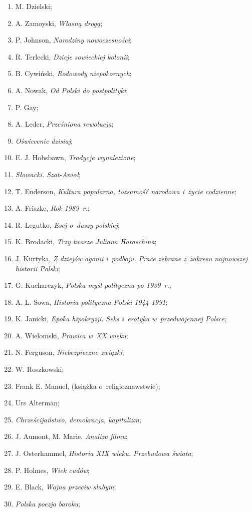 \documentclass[a4paper,11pt]{article}
\begin{document}
\begin{enumerate}
\item M. Dzielski;
\item A. Zamoyski, \emph{Własną drogą};
\item P. Johnson, \emph{Narodziny nowoczesności};
\item R. Terlecki, \emph{Dzieje sowieckiej kolonii};
\item B. Cywiński, \emph{Rodowody niepokornych};
\item A. Nowak, \emph{Od Polski do postpolityki};
\item P. Gay;
\item A. Leder, \emph{Prześniona rewolucja};
\item \emph{Oświecenie dzisiaj};
\item E. J. Hobsbawn, \emph{Tradycje wynalezione};
\item \emph{Słowacki. Szat-Anioł};
\item T. Enderson, \emph{Kultura popularna, tożsamość narodowa i~życie
    codzienne};
\item A. Friszke, \emph{Rok 1989~r.};
\item R. Legutko, \emph{Esej o~duszy polskiej};
\item K. Brodacki, \emph{Trzy twarze Juliana Haraschina};
\item J. Kurtyka, \emph{Z dziejów agonii i~podboju. Prace zebrane
    z~zakresu najnowszej historii Polski};
\item G. Kucharczyk, \emph{Polska myśl polityczna po 1939~r.};
\item A. L. Sowa, \emph{Historia polityczna Polski 1944-1991};
\item K. Janicki, \emph{Epoka hipokryzji. Seks i~erotyka
    w~przedwojennej Polsce};
\item A. Wielomski, \emph{Prawica w~XX wieku};
\item N. Ferguson, \emph{Niebezpieczne związki};
\item W. Roszkowski;
\item Frank E. Manuel, (książka o~religioznawstwie);
\item Urs Alterman;
\item \emph{Chrześcijaństwo, demokracja, kapitalizm};
\item J. Aumont, M. Marie, \emph{Analiza filmu};
\item J. Osterhammel, \emph{Historia XIX wieku. Przebudowa świata};
\item P. Holmes, \emph{Wiek cudów};
\item E. Black, \emph{Wojna przeciw słabym};
\item \emph{Polska poezja baroku};

\end{enumerate}
\end{document}
